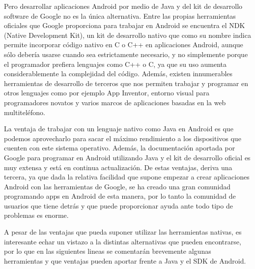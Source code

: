 \documentclass[
10pt, %
a4paper, %
oneside, %
headinclude,footinclude, %
BCOR5mm, %
]{scrartcl}
\begin{document}
Pero desarrollar aplicaciones Android por medio de Java y del kit de desarrollo software de Google no es la única alternativa. Entre las propias herramientas oficiales que Google proporciona para trabajar en Android se encuentra el NDK (Native Development Kit), un kit de desarrollo nativo que como su nombre indica permite incorporar código nativo en C o C++ en aplicaciones Android, aunque sólo debería usarse cuando sea estrictamente necesario, y no simplemente porque el programador prefiera lenguajes como C++ o C, ya que su uso aumenta considerablemente la complejidad del código. Además, existen innumerables herramientas de desarrollo de terceros que nos permiten trabajar y programar en otros lenguajes como por ejemplo App Inventor, entorno visual para programadores novatos y varios marcos de aplicaciones basadas en la web multiteléfono. 

La ventaja de trabajar con un lenguaje nativo como Java en Android es que podemos aprovecharlo para sacar el máximo rendimiento a los dispositivos que cuenten con este sistema operativo. Además, la documentación aportada por Google para programar en Android utilizando Java y el kit de desarrollo oficial es muy extensa y está en continua actualización. De estas ventajas, deriva una tercera, ya que dada la relativa facilidad que supone empezar a crear aplicaciones Android con las herramientas de Google, se ha creado una gran comunidad programando apps en Android de esta manera, por lo tanto la comunidad de usuarios que tiene detrás y que puede proporcionar ayuda ante todo tipo de problemas es enorme.

A pesar de las ventajas que pueda suponer utilizar las herramientas nativas, es interesante echar un vistazo a la distintas alternativas que pueden encontrarse, por lo que en las siguientes lineas se comentarán brevemente algunas herramientas y que ventajas pueden aportar frente a Java y el SDK de Android.
\end{document}

